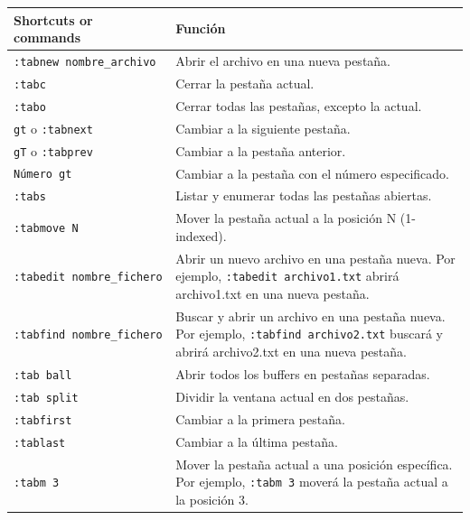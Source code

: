 \documentclass[
  doc,
  floatsintext,
  longtable,
  a4paper,
  nolmodern,
  notxfonts,
  notimes,
  12pt,
  colorlinks=true,linkcolor=blue,citecolor=blue,urlcolor=blue]{apa7}
\newcounter{none} %
\begin{document}
{\def\LTcaptype{none} %
\begin{longtable}[]{@{}
  >{\raggedright\arraybackslash}p{}
  >{\raggedright\arraybackslash}p{}@{}}
\toprule\noalign{}
\begin{minipage}[b]{\linewidth}\raggedright
Shortcuts or commands
\end{minipage} & \begin{minipage}[b]{\linewidth}\raggedright
Función
\end{minipage} \\
\midrule\noalign{}
\endhead
\bottomrule\noalign{}
\endlastfoot
\texttt{:tabnew\ nombre\_archivo} & Abrir el archivo en una nueva
pestaña. \\
\texttt{:tabc} & Cerrar la pestaña actual. \\
\texttt{:tabo} & Cerrar todas las pestañas, excepto la actual. \\
\texttt{gt} o \texttt{:tabnext} & Cambiar a la siguiente pestaña. \\
\texttt{gT} o \texttt{:tabprev} & Cambiar a la pestaña anterior. \\
\texttt{Número\ gt} & Cambiar a la pestaña con el número
especificado. \\
\texttt{:tabs} & Listar y enumerar todas las pestañas abiertas. \\
\texttt{:tabmove\ N} & Mover la pestaña actual a la posición N
(1-indexed). \\
\texttt{:tabedit\ nombre\_fichero} & Abrir un nuevo archivo en una
pestaña nueva. Por ejemplo, \texttt{:tabedit\ archivo1.txt} abrirá
archivo1.txt en una nueva pestaña. \\
\texttt{:tabfind\ nombre\_fichero} & Buscar y abrir un archivo en una
pestaña nueva. Por ejemplo, \texttt{:tabfind\ archivo2.txt} buscará y
abrirá archivo2.txt en una nueva pestaña. \\
\texttt{:tab\ ball} & Abrir todos los buffers en pestañas separadas. \\
\texttt{:tab\ split} & Dividir la ventana actual en dos pestañas. \\
\texttt{:tabfirst} & Cambiar a la primera pestaña. \\
\texttt{:tablast} & Cambiar a la última pestaña. \\
\texttt{:tabm\ 3} & Mover la pestaña actual a una posición específica.
Por ejemplo, \texttt{:tabm\ 3} moverá la pestaña actual a la posición
3. \\

\end{longtable}}
\end{document}
